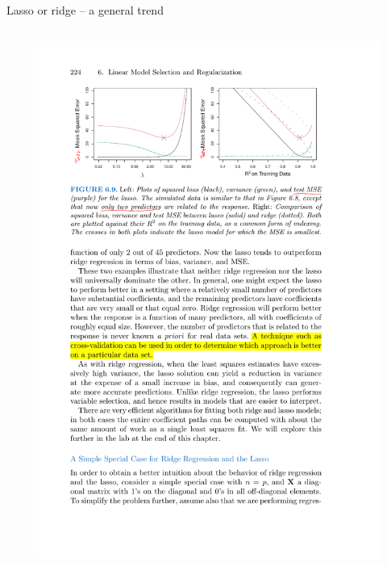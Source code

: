 \documentclass[mathserif, aspectratio=169]{beamer}
\begin{document}
\begin{frame}{Lasso or ridge -- a general trend}
\begin{columns}
\begin{figure}
\includegraphics[scale=1]{lasso-v-ridge-2variables}
\end{figure}
\end{columns}

\end{frame}
\end{document}
